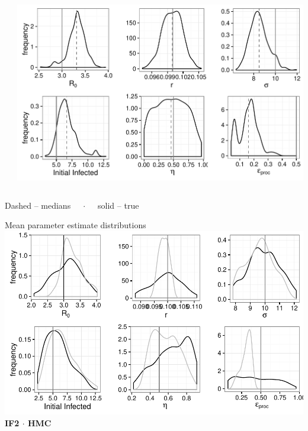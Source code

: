 \documentclass[12pt]{beamer}
\begin{document}
\begin{frame}
\begin{columns}
\begin{column}{0.25\textwidth}
		\end{column}
		\begin{column}{0.65\textwidth}

			\includegraphics[width=\textwidth,height=0.45\textheight,keepaspectratio=true]{../../writing/SC1/images/hmckernels}

		\end{column}
	\end{columns}

	\tiny
	\vspace{0.5\baselineskip}
	\centering
	Dashed -- medians $\quad\cdot\quad$ solid -- true

\end{frame}


\begin{frame}

	\null
	\large
	Mean parameter estimate distributions \\
	\vspace{\baselineskip}
	\includegraphics[width=\textwidth,height=\textheight,keepaspectratio=true]{../../writing/SC1/images/combined-multi} \\
	\centering
	\normalsize
	\textbf{IF2 \quad $\cdot$ \quad \textcolor{Grey50}{HMC}}

\end{frame}
\end{document}
